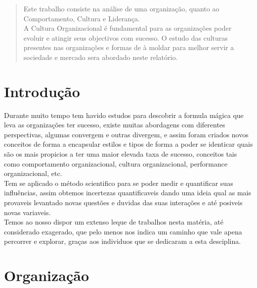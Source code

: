 
%

%
\tableofcontents
%
%
\pagestyle{plain} %
\newpage
\label{Resumo}
\begin{abstract} 
Este trabalho consiste na análise de uma organização, quanto ao Comportamento, Cultura e Liderança.\\

A Cultura Organizacional é fundamental para as organizações poder evoluir e atingir seus objectivos com sucesso. O estudo das culturas presentes nas organizações e formas de à moldar para melhor servir a sociedade e mercado sera abordado neste relatório.
\end{abstract}
\newpage
\section{Introdução}
Durante muito tempo tem havido estudos para descobrir a formula mágica que leva as organizações ter sucesso, existe muitas abordagens com diferentes perspectivas, algumas convergem e outras divergem, e assim foram criados novos conceitos de forma a encapsular estilos e tipos de forma a poder se identicar quais são os mais propicios a ter uma maior elevada taxa de sucesso, conceitos tais como comportamento organizacional, cultura organizacional, performance organizacional, etc.\\

Tem se aplicado o método scientifico para se poder medir e quantificar suas influências, assim obtemos incertezas quantificaveis dando uma ideia qual as mais provaveis levantado novas questões e duvidas das suas interações e até posiveis novas variaveis.\\

Temos ao nosso dispor um extenso leque de trabalhos nesta matéria, até considerado exagerado, que pelo menos nos indica um caminho que vale apena percorrer e explorar, graças aos individuos que se dedicaram a esta desciplina.\\


\section{Organização}

